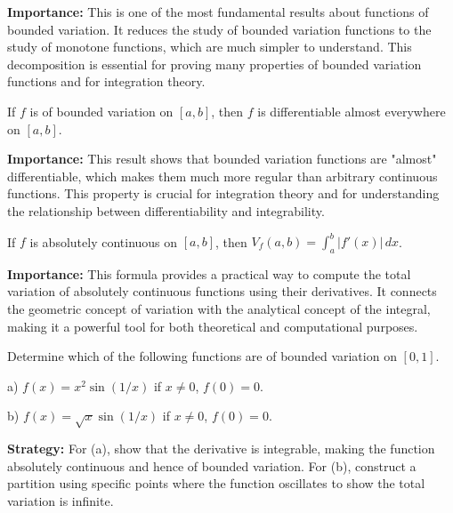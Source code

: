 \noindent\textbf{Importance:} This is one of the most fundamental results about functions of bounded variation. It reduces the study of bounded variation functions to the study of monotone functions, which are much simpler to understand. This decomposition is essential for proving many properties of bounded variation functions and for integration theory.



\begin{theorem}
If $f$ is of bounded variation on $[a, b]$, then $f$ is differentiable almost everywhere on $[a, b]$.
\end{theorem}

\noindent\textbf{Importance:} This result shows that bounded variation functions are "almost" differentiable, which makes them much more regular than arbitrary continuous functions. This property is crucial for integration theory and for understanding the relationship between differentiability and integrability.



\begin{theorem}
If $f$ is absolutely continuous on $[a, b]$, then $V_f(a, b) = \int_a^b |f'(x)| \, dx$.
\end{theorem}

\noindent\textbf{Importance:} This formula provides a practical way to compute the total variation of absolutely continuous functions using their derivatives. It connects the geometric concept of variation with the analytical concept of the integral, making it a powerful tool for both theoretical and computational purposes.




\begin{problembox}
\begin{problemstatement}
Determine which of the following functions are of bounded variation on $[0, 1]$.

a) $f(x) = x^2 \sin (1/x)$ if $x \neq 0$, $f(0) = 0$.

b) $f(x) = \sqrt{x} \sin (1/x)$ if $x \neq 0$, $f(0) = 0$.
\end{problemstatement}
\end{problembox}

\noindent\textbf{Strategy:} For (a), show that the derivative is integrable, making the function absolutely continuous and hence of bounded variation. For (b), construct a partition using specific points where the function oscillates to show the total variation is infinite.

